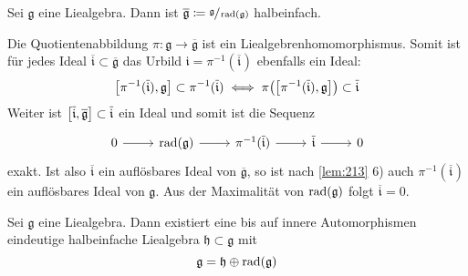 \begin{proposition}[{name=[Quotient mit Radikal ist stets halbeinfach]}]
	Sei $\mathfrak{g}$ eine Liealgebra.
	Dann ist $\overline{\mathfrak{g}} \coloneqq \sfrac{\mathfrak{g}}{\rad(\mathfrak{g})}$ halbeinfach.
\end{proposition}
\begin{beweis}
	Die Quotientenabbildung $\pi \colon \mathfrak{g} \to \overline{\mathfrak{g}}$ ist ein Liealgebrenhomomorphismus.
	Somit ist für jedes Ideal $\overline{\mathfrak{i}} \subset \overline{\mathfrak{g}}$ das Urbild $\mathfrak{i} = \pi^{-1}(\overline{\mathfrak{i}})$ ebenfalls ein Ideal:
	\[
		\benbrace*{\pi^{-1}(\overline{\mathfrak{i}}), \mathfrak{g}} \subset \pi^{-1}(\overline{\mathfrak{i}}) \iff \pi \enbrace*{\benbrace*{\pi^{-1}(\overline{\mathfrak{i}}), \mathfrak{g}}} \subset \overline{\mathfrak{i}}
	\]
	Weiter ist $\benbrace*{\overline{\mathfrak{i}}, \overline{\mathfrak{g}}} \subset \overline{\mathfrak{i}}$ ein Ideal und somit ist die Sequenz
	\[
		\begin{tikzcd}
			0 \rar & \rad(\mathfrak{g}) \rar & \pi^{-1}(\overline{\mathfrak{i}}) \rar &\overline{\mathfrak{i}} \rar & 0
		\end{tikzcd}
	\] 
	exakt.
	Ist also $\overline{\mathfrak{i}}$ ein auflösbares Ideal von $\overline{\mathfrak{g}}$, so ist nach \autoref{lem:213} 6) auch $\pi^{-1}(\overline{\mathfrak{i}})$ ein auflösbares Ideal von $\mathfrak{g}$.
	Aus der Maximalität von $\rad(\mathfrak{g})$ folgt $\overline{\mathfrak{i}}=0$.
\end{beweis}

\begin{satz}[{name={Levi-Malcev}},label=satz:216]
	Sei $\mathfrak{g}$ eine Liealgebra.
	Dann existiert eine bis auf innere Automorphismen eindeutige halbeinfache Liealgebra $\mathfrak{h} \subset \mathfrak{g}$ mit
	\[
		\mathfrak{g} = \mathfrak{h} \oplus  \rad(\mathfrak{g})
	\]
\end{satz}

